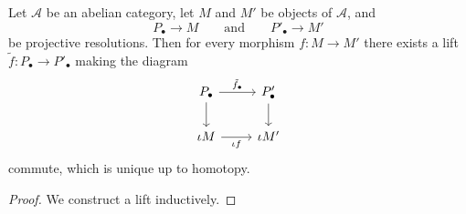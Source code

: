 \documentclass[main.tex]{subfiles}
\begin{document}
\begin{proposition}
  \label{prop:can_lift_morphisms_to_projective_resolutions}
  Let $\mathcal{A}$ be an abelian category, let $M$ and $M'$ be objects of $\mathcal{A}$, and
  \begin{equation*}
    P_{\bullet} \to M \qquad\text{and}\qquad P'_{\bullet} \to M'
  \end{equation*}
  be projective resolutions. Then for every morphism $f\colon M \to M'$ there exists a lift $\tilde{f}\colon P_{\bullet} \to P'_{\bullet}$ making the diagram
  \begin{equation*}
    \begin{tikzcd}
      P_{\bullet}
      \arrow[r, "\tilde{f}_{\bullet}"]
      \arrow[d]
      & P'_{\bullet}
      \arrow[d]
      \\
      \iota M
      \arrow[r, swap, "\iota f"]
      & \iota M'
    \end{tikzcd}
  \end{equation*}
  commute, which is unique up to homotopy.
\end{proposition}
\begin{proof}
  We construct a lift inductively.
\end{proof}
\end{document}
